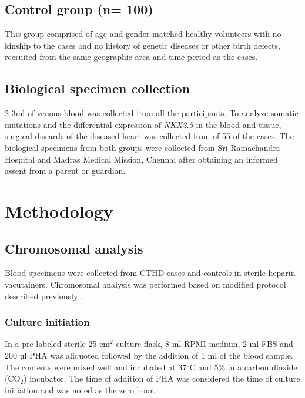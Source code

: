 \begin{refsection}
\subsection{Control group (n= 100)}
This group comprised of age and gender matched healthy volunteers with no kinship to the cases and no history of genetic diseases or other birth defects, recruited from the same geographic area and time period as the cases. 


\subsection{Biological specimen collection}
2-3ml of venous blood was collected from all the participants. To analyze somatic mutations and the differential expression of \textit{NKX2.5} in the blood and tissue, surgical discards of the diseased heart was collected from of 55 of the cases. The biological specimens from both groups were collected from Sri Ramachandra Hospital and Madras Medical Mission, Chennai after obtaining an informed assent from a parent or guardian. 

\section{Methodology}

\subsection{Chromosomal analysis} 
Blood specimens were collected from CTHD cases and controls in sterile heparin vacutainers.
Chromosomal analysis was performed based on modified protocol described previously \cite{barch1997agt, moorhead1960chromosome, babu1995human, dracopoli1994current}.
\subsubsection{Culture initiation}
In a pre-labeled sterile 25 cm$^2$ culture flask, 8 ml RPMI medium, 2 ml FBS and 200 µl PHA was aliquoted followed by the addition of 1 ml of the blood sample. The contents were mixed well and incubated at 37°C and 5\% in a carbon dioxide (CO$_2$) incubator. The time of addition of PHA was considered the time of culture initiation and was noted as the zero hour.

\end{refsection}
